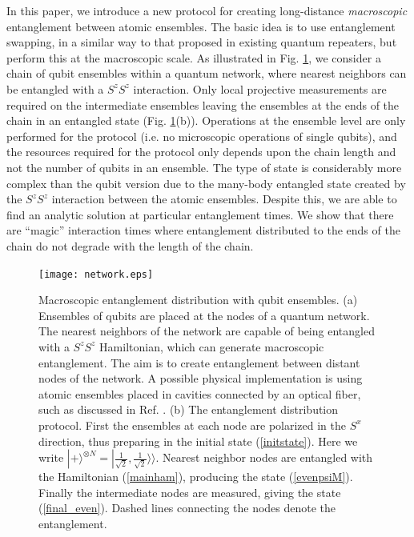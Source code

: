 \documentclass[%
  prx,%
  twocolumn,%
  preprintnumbers,%
  amsmath,%
  amssymb,%
  superscriptaddress%
]{revtex4}
\begin{document}
In this paper, we introduce a new protocol for creating long-distance {\it macroscopic} entanglement between atomic ensembles. The basic idea is to use entanglement swapping, in a similar way to that proposed in existing quantum repeaters, but perform this at the macroscopic scale. As illustrated in Fig. \ref{fig1}, we consider a chain of qubit ensembles within a quantum network, where nearest neighbors can be entangled with a $S^z S^z$ interaction.  Only local projective measurements are required on the intermediate ensembles leaving the ensembles at the ends of the chain in an entangled state (Fig. \ref{fig1}(b)).  Operations at the ensemble level are only performed for the protocol (i.e. no microscopic operations of single qubits), and the resources required for the protocol only depends upon the chain length and not the number of qubits in an ensemble.
The type of state is considerably more complex than the qubit version due to the many-body entangled state created by the $S^z S^z$ interaction between the atomic ensembles. Despite this, we are able to find an analytic solution at particular entanglement times.  We show that there are ``magic'' interaction times  where entanglement distributed to the ends of the chain do not degrade with the length of the chain.



\begin{figure}[t]
\centering
\texttt{[image: network.eps]}
\caption{\label{fig1}
Macroscopic entanglement distribution with qubit ensembles.  (a) Ensembles of qubits are placed at the nodes of a quantum network.  The nearest neighbors of the network are capable of being entangled with a $ S^z S^z $ Hamiltonian, which can generate macroscopic entanglement.  The aim is to create entanglement between distant nodes of the network.  A possible physical implementation is using atomic ensembles placed in cavities connected by an optical fiber, such as discussed in Ref. \cite{pyrkov2013entanglement}.
(b) The entanglement distribution protocol.  First the ensembles at each node are polarized in the $ S^x $ direction, thus preparing in the initial state (\ref{initstate}).  Here we write $ | + \rangle^{\otimes N } = | \frac{1}{\sqrt{2}}, \frac{1}{\sqrt{2}}
\rangle \rangle $. Nearest neighbor nodes are entangled with the Hamiltonian (\ref{mainham}), producing the state (\ref{evenpsiM}).  Finally the intermediate nodes are measured, giving the state (\ref{final_even}). Dashed lines connecting the nodes denote the entanglement.    }
\end{figure}
\end{document}
